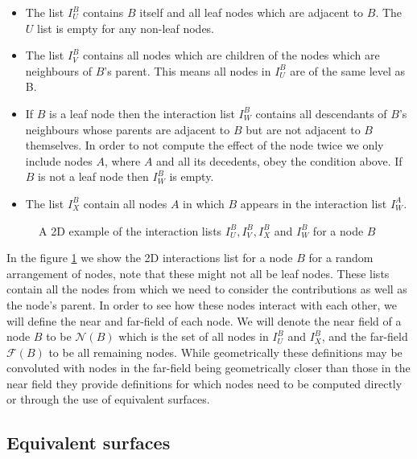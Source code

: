 \begin{itemize}
\item The list $I^B_U$ contains $B$ itself and all leaf nodes which are adjacent to $B$. The $U$ list is empty for any non-leaf nodes.

\item The list $I_V^B$ contains all nodes which are children of the nodes which are neighbours of $B$'s parent. This means all nodes in $I_U^B$ are of the same level as B.

\item If $B$ is a leaf node then the interaction list $I_W^B$ contains all descendants of $B$'s neighbours whose parents are adjacent to $B$ but are not adjacent to $B$ themselves. In order to not compute the effect of the node twice we only include nodes $A$, where $A$ and all its decedents, obey the condition above. If $B$ is not a leaf node then $I_W^B$ is empty.

\item The list $I_X^B$ contain all nodes $A$ in which $B$ appears in the interaction list $I_W^A$.
\end{itemize}

\begin{figure}[ht]
    \centering
    
    \caption{A 2D example of the interaction lists $I_U^B, I_V^B, I_X^B$ and $I_W^B$ for a node $B$}
    \label{fig:InteractionsLists}
\end{figure}


In the figure \ref{fig:InteractionsLists} we show the 2D interactions list for a node $B$ for a random arrangement of nodes, note that these might not all be leaf nodes. These lists contain all the nodes from which we need to consider the contributions as well as the node's parent. In order to see how these nodes interact with each other, we will define the near and far-field of each node. We will denote the near field of a node $B$ to be $\mathcal{N}(B)$ which is the set of all nodes in $I_U^B$ and $I_X^B$, and the far-field $\mathcal{F}(B)$ to be all remaining nodes. While geometrically these definitions may be convoluted with nodes in the far-field being geometrically closer than those in the near field they provide definitions for which nodes need to be computed directly or through the use of equivalent surfaces.

\subsection{Equivalent surfaces}

